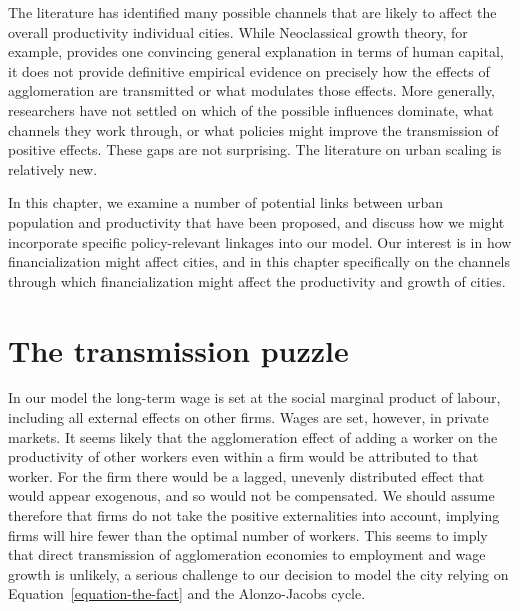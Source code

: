  The literature has identified many possible channels that are likely to affect the overall productivity individual cities. 
 While Neoclassical growth theory, for example, provides one convincing general explanation in terms of human capital, it does not provide definitive empirical evidence on precisely how the effects of agglomeration are transmitted or what modulates those effects. More generally, researchers have not settled on which  of the possible influences dominate, what channels they work through, or what policies might improve the transmission of positive effects. These gaps are  not surprising. The literature on urban scaling is relatively new.  

  In this chapter, we examine a number of potential  links between urban population and productivity that have been proposed, and discuss how we  might incorporate specific policy-relevant linkages into our model.  Our interest is in how financialization might affect cities, and in this chapter specifically on the channels through which financialization might affect the productivity and growth of cities.



\section{The transmission puzzle}
 In our model the long-term wage is set at the social marginal product of labour, including all external effects on other firms. Wages are set, however, in private markets. It seems likely that the agglomeration effect of adding a worker on the productivity of other workers even within a firm  would be attributed to that worker. For the firm there  would be a lagged, unevenly distributed effect that would appear exogenous, and so would not be
compensated. We should  assume therefore that firms do not take the positive externalities into account, implying firms will hire fewer than the optimal number of workers. This seems to imply that direct transmission of agglomeration economies to employment and wage growth is unlikely,  a serious challenge to our decision to model the city relying on Equation~\ref{equation-the-fact} and the  Alonzo-Jacobs cycle.


